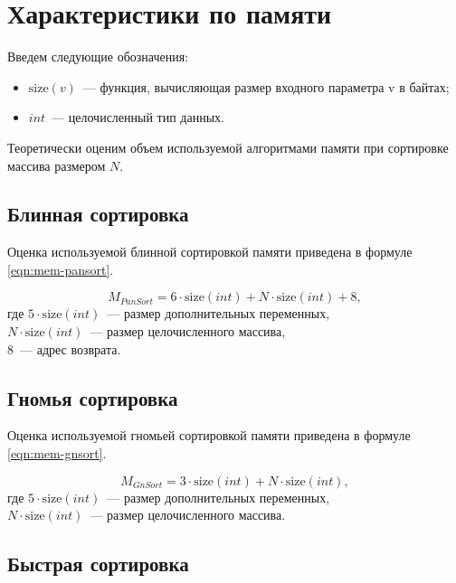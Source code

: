 \section{Характеристики по памяти}

Введем следующие обозначения:
\begin{itemize}
    \item $\text{size}(v)$~--- функция, вычисляющая размер входного параметра v в байтах;
    \item $int$~--- целочисленный тип данных.
\end{itemize}

Теоретически оценим объем используемой алгоритмами памяти при сортировке массива размером $N$.


\subsection{Блинная сортировка}

Оценка используемой блинной сортировкой памяти приведена в формуле \ref{eqn:mem-pansort}.

\begin{equation}
    \label{eqn:mem-pansort}
    M_{PanSort} = 6 \cdot \text{size}(int) + N \cdot \text{size}(int) + 8,
\end{equation}
где $5 \cdot \text{size}(int)$~--- размер дополнительных переменных,
\\ $N \cdot \text{size}(int)$~--- размер целочисленного массива,
\\ $8$~--- адрес возврата.

\subsection{Гномья сортировка}

Оценка используемой гномьей сортировкой памяти приведена в формуле \ref{eqn:mem-gnsort}.

\begin{equation}
    \label{eqn:mem-gnsort}
    M_{GnSort} = 3 \cdot \text{size}(int) + N \cdot \text{size}(int),
\end{equation}
где $5 \cdot \text{size}(int)$~--- размер дополнительных переменных,
\\ $N \cdot \text{size}(int)$~--- размер целочисленного массива.


\subsection{Быстрая сортировка}

